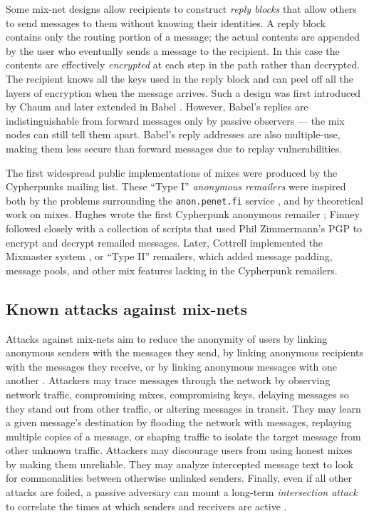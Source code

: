\documentclass[11pt]{IEEEtran}
\begin{document}
Some mix-net designs allow recipients to construct \emph{reply blocks}
that allow others to send messages to them without knowing their
identities. A reply block contains only the routing portion of a message;
the actual contents are appended by the user who eventually sends a
message to the recipient. In this case the contents are effectively
\emph{encrypted} at each step in the path rather than decrypted.
The recipient knows all the keys used in the reply block and can peel
off all the layers of encryption when the message arrives. Such a design
was first introduced by Chaum \cite{chaum-mix} and later extended in
Babel \cite{babel}. However, Babel's replies are indistinguishable from
forward messages only by passive observers --- the mix nodes can still
tell them apart. Babel's reply addresses are also multiple-use, making them
less secure than forward messages due to replay vulnerabilities.

The first widespread public implementations of mixes were produced by the
Cypherpunks mailing list. These ``Type I'' \emph{anonymous remailers}
were inspired both by the problems surrounding the {\tt anon.penet.fi}
service \cite{helsingius}, and by theoretical work on mixes. Hughes
wrote the first Cypherpunk anonymous remailer \cite{remailer-history};
Finney followed closely with a collection of scripts that used Phil
Zimmermann's PGP to encrypt and decrypt remailed messages. Later, Cottrell
implemented the Mixmaster system \cite{mixmaster}\cite{mixmaster-spec},
or ``Type II'' remailers, which added message padding, message pools,
and other mix features lacking in the Cypherpunk remailers.

\subsection{Known attacks against mix-nets}

Attacks against mix-nets aim to reduce the anonymity of users by
linking anonymous senders with the messages they send, by linking
anonymous recipients with the messages they receive, or by linking
anonymous messages with one another \cite{raymond00}.  Attackers may
trace messages through the network by observing network
traffic, compromising mixes, compromising keys, delaying messages
so they stand out from other traffic, or altering messages
in transit.  They may learn a given message's destination
by flooding the network with messages, replaying multiple copies
of a message, or shaping traffic to isolate the target message from
other unknown traffic. Attackers may discourage users from
using honest mixes by making them unreliable. They may analyze
intercepted message text to look for commonalities between otherwise
unlinked senders.
Finally, even if all other attacks are foiled, a passive adversary can
mount a long-term \emph{intersection attack} to correlate the times at
which senders and receivers are active \cite{disad-free-routes}.
\end{document}
